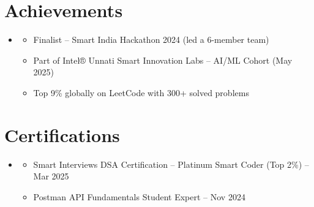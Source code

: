 \documentclass[letterpaper,11pt]{article}
\newcommand{\resumeItem}[1]{\item\small{{#1 \vspace{-2pt}}}}
\newcommand{\resumeItemListStart}{\begin{itemize}[leftmargin=0.15in, label=$\bullet$]}
\newcommand{\resumeItemListEnd}{\end{itemize}\vspace{-5pt}}
\newcommand{\resumeSubHeadingListStart}{\begin{itemize}[leftmargin=0.15in, label={}]}
\newcommand{\resumeSubHeadingListEnd}{\end{itemize}}
\begin{document}
\section{Achievements}
\resumeSubHeadingListStart
  \item
    \resumeItemListStart
      \resumeItem{Finalist – Smart India Hackathon 2024 (led a 6-member team)}
      \resumeItem{Part of Intel® Unnati Smart Innovation Labs – AI/ML Cohort (May 2025)}
      \resumeItem{Top 9\% globally on LeetCode with 300+ solved problems}
    \resumeItemListEnd
\resumeSubHeadingListEnd

\section{Certifications}
\resumeSubHeadingListStart
  \item
    \resumeItemListStart
      \resumeItem{Smart Interviews DSA Certification – Platinum Smart Coder (Top 2\%) – Mar 2025}
      \resumeItem{Postman API Fundamentals Student Expert – Nov 2024}
    \resumeItemListEnd
\resumeSubHeadingListEnd
\end{document}
